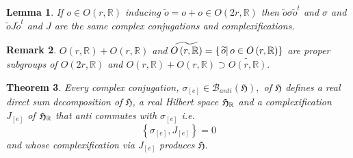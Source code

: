 \documentclass[aps,preprint]{revtex4}
\newtheorem{theorem}{Theorem}
\newtheorem{lemma}[theorem]{Lemma}
\newtheorem{remark}[theorem]{Remark}
\begin{document}
\begin{lemma}
If $o\in O\left( r,\mathbb{R}\right) $ inducing $\widetilde{o}=o+o\in
O\left( 2r,\mathbb{R}\right) $ then $\widetilde{o}\sigma\widetilde{o}^{t}$
and $\sigma$ and $\widetilde{o}J\widetilde{o}^{t}$ and $J$ are the same
complex conjugations and complexifications.
\end{lemma}

\begin{remark}
$O\left( r,\mathbb{R}\right) +O\left( r,\mathbb{R}\right) $ and $\widetilde{%
O\left( r,\mathbb{R}\right) }=\left\{ \left. \widetilde{o}\right\vert o\in
O\left( r,\mathbb{R}\right) \right\} $ are proper subgroups of $O\left( 2r,%
\mathbb{R}\right) $ and $O\left( r,\mathbb{R}\right) +O\left( r,\mathbb{R}%
\right) \supset\widetilde{O\left( r,\mathbb{R}\right) }.$
\end{remark}

\begin{theorem}
Every complex conjugation, $\sigma_{\left[ e\right] }\in\mathcal{B}%
_{anti}\left( \mathfrak{H}\right) ,$ of $\mathfrak{H}$ defines a real direct
sum decomposition of $\mathfrak{H}$, a real Hilbert space $\mathfrak{H}_{%
\mathbb{R}}$ and a complexification $J_{\left[ e\right] }$ of $\mathfrak{H}_{%
\mathbb{R}}$ that anti commutes with $\sigma_{\left[ e\right] }$ i.e. 
\begin{equation}
\left\{ \sigma_{\left[ e\right] },J_{\left[ e\right] }\right\} =0
\end{equation}
and whose complexification via $J_{\left[ e\right] }$ produces $\mathfrak{H.}
$
\end{theorem}
\end{document}
